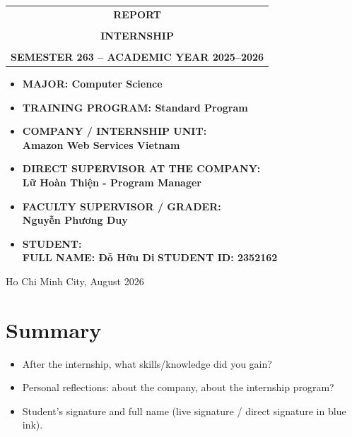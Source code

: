 \documentclass[a4paper]{article}
\begin{document}
\begin{titlepage}
\begin{center}
\begin{tabular}{c}
\multicolumn{1}{c}{\textbf{{\LARGE REPORT}}}\\
\\{\textbf{{\LARGE INTERNSHIP}}}
\\
\\
\textbf{\Large SEMESTER 263 -- ACADEMIC YEAR 2025--2026} \\
\end{tabular}
\end{center}
\vspace{0.5cm}
\begin{itemize}
\renewcommand\labelitemi{--}
    \item \Large \textbf{MAJOR: Computer Science}
    \item \Large \textbf{TRAINING PROGRAM: Standard Program}
\end{itemize}
\vspace{0.7cm}
\begin{itemize}
\renewcommand\labelitemi{--}
    \item \Large \textbf{COMPANY / INTERNSHIP UNIT:}
    \\ \Large \textbf{Amazon Web Services Vietnam}
    \item \Large \textbf{DIRECT SUPERVISOR AT THE COMPANY:}
    \\ \Large \textbf{Lữ Hoàn Thiện - Program Manager}
    \item \Large \textbf{FACULTY SUPERVISOR / GRADER:}
    \\ \Large \textbf{Nguyễn Phương	Duy}
    \item \Large \textbf{STUDENT:}
    \\ \Large \textbf{FULL NAME: Đỗ Hữu Di} \textbf{STUDENT ID: 2352162}
\end{itemize}
\vspace{0.5cm}
\begin{center}
{\Large Ho Chi Minh City, August 2026}
\end{center}
\end{titlepage}

\newpage
\tableofcontents
\newpage





\newpage
\section{Summary}
\begin{itemize}
    \item After the internship, what skills/knowledge did you gain?
    \item Personal reflections: about the company, about the internship program?
    \item Student's signature and full name (live signature / direct signature in blue ink).
\end{itemize}

\end{document}
